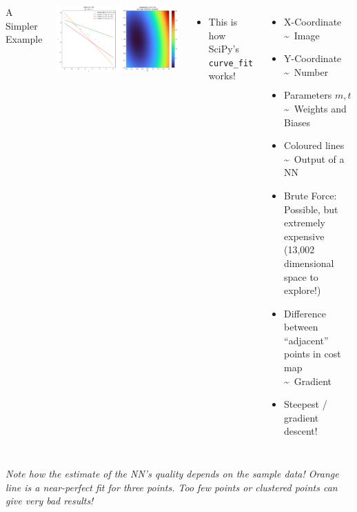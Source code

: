 
\begin{frame}
%
\begin{columns}[T]
	\begin{Large}
		{A Simpler Example}
	\end{Large}
	\includegraphics[width=\linewidth]{./gfx/costMap}
	\begin{itemize}
	\item[\Thus] This is how SciPy's \texttt{curve\_fit} works!
	\end{itemize}
%
	\begin{itemize}
	\item X-Coordinate \textasciitilde~Image
	\item Y-Coordinate \textasciitilde~Number
	\item Parameters $m, t$ \textasciitilde~Weights and Biases
	\item Coloured lines \textasciitilde~Output of a NN
	\item Brute Force: Possible, but extremely expensive (13,002 dimensional space to explore!)
	\item Difference between \enquote{adjacent} points in cost map \textasciitilde~Gradient
	\item Steepest / gradient descent!
	\end{itemize}
\end{columns}
%
\begin{center}
\small
\emph{Note how the estimate of the NN's quality depends on the sample data! Orange line is a near-perfect fit for three points. Too few points or clustered points can give very bad results!} 
\end{center}
%
\end{frame}

